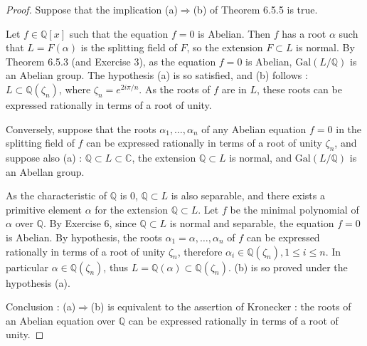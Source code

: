 \documentclass[11pt,a4paper]{article}
\newcommand{\Q}{\mathbb{Q}}
\newcommand{\C}{\mathbb{C}}
\newcommand{\Gal}{\mathrm{Gal}}
\begin{document}
\begin{proof}
Suppose that the implication (a)$\Rightarrow$(b) of Theorem 6.5.5 is true.

Let $f \in \Q[x]$ such that the equation $f=0$ is Abelian. Then $f$ has a root $\alpha$ such that $L = F(\alpha)$ is the splitting field of $F$, so the extension $F \subset L$ is normal. By Theorem 6.5.3 (and Exercise 3), as the equation $f=0$ is Abelian, $\Gal(L/\Q)$ is an Abelian group. The hypothesis (a) is so satisfied, and  (b) follows : $L \subset \Q(\zeta_n)$, where $\zeta_n =e^{2i\pi/n}$. As the roots of $f$ are in $L$, these roots can be expressed rationally in terms of a root of unity.

Conversely, suppose that the roots $\alpha_1,\ldots,\alpha_n$ of any Abelian equation $f=0$ in the splitting field of $f$ can be expressed rationally in terms of a root of unity
 $\zeta_n$, and suppose also (a) : $\Q\subset L \subset \C$, the extension $\Q\subset L$ is normal, and $\Gal(L/\Q)$ is an Abellan group.
 
 As the characteristic of $\Q$ is 0, $\Q\subset L$  is also separable, and there exists a primitive element $\alpha$ for the extension  $\Q \subset L$. Let $f$ be the minimal polynomial of $\alpha$ over $\Q$. By Exercise 6, since $\Q\subset L$ is normal and separable, the equation $f=0$ is Abelian. By hypothesis, the roots  $\alpha_1=\alpha,\ldots,\alpha_n$ of $f$ can be expressed rationally in terms of a root of unity $\zeta_n$, therefore $\alpha_i \in \Q(\zeta_n), 1\leq i \leq n$. In particular $\alpha \in \Q(\zeta_n)$, thus $L = \Q(\alpha) \subset \Q(\zeta_n)$. (b) is so proved under the hypothesis (a).


Conclusion : (a)$\Rightarrow$(b) is equivalent to the assertion of Kronecker : the roots of an Abelian equation over $\Q$ can be expressed rationally in terms of a root of unity.
\end{proof}
\end{document}
